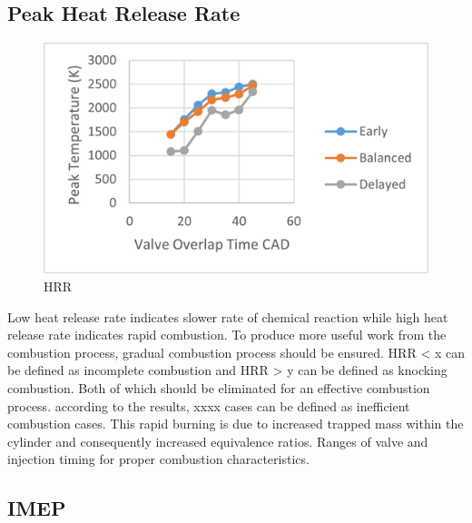 \documentclass[conference]{IEEEtran}
\begin{document}
\subsection{Peak Heat Release Rate}
\begin{figure}[htbp]
    \centerline{\includegraphics{Plots/hrr.png}}
    \caption{HRR}
    \label{plt_4}
    \end{figure}

Low heat release rate indicates slower rate of chemical reaction while high heat release rate indicates rapid combustion. To produce more useful work from the combustion process, gradual combustion process should be ensured. 
HRR < x can be defined as incomplete combustion and HRR > y can be defined as knocking combustion. Both of which should be eliminated for an effective combustion process.
according to the results, xxxx cases can be defined as inefficient combustion cases.
This rapid burning is due to increased trapped mass within the cylinder and consequently increased equivalence ratios.
Ranges of valve and injection timing for proper combustion characteristics.

\subsection{IMEP}
\end{document}
